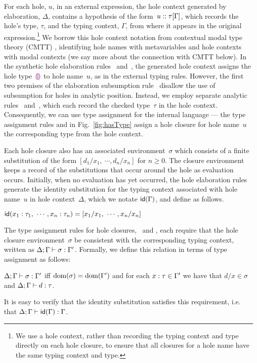 %
For each hole, $u$, in an external expression, the hole context generated
by elaboration, $\Delta$, contains a hypothesis of the
form~$u :: \tau[\Gamma]$, which records the hole's type, $\tau$,
and the typing context, $\Gamma$, from where it appears in the original
expression.\footnote{ We use a hole context, rather than recording the
  typing context and type directly on each hole closure, to ensure that all
  closures for a hole name have the same typing context and type.}
%
We borrow this hole context notation from contextual modal type theory
(CMTT) \cite{Nanevski2008}, identifying hole names with metavariables and
hole contexts with modal contexts (we say more about the connection with
CMTT below).
%
%
In the synthetic hole elaboration rules~
and~, the generated hole context assigns the hole
type~$\textcolor{violet}{\llparenthesis}\textcolor{violet}{\rrparenthesis}$ to hole name~$u$, as in the external typing rules.
%
However, the first two premises of the elaboration subsumption
rule~ disallow the use of subsumption for holes in
analytic position.
%
Instead, we employ separate analytic rules~
and~, which each record the checked type~$\tau$ in the
hole context.
%
Consequently, we can use type assignment for the internal language --- the
type assignment rules  and  in
Fig.~\ref{fig:hasType} assign a hole closure for hole name~$u$ the
corresponding type from the hole context.

Each hole closure also has an associated environment~$\sigma$ which
consists of a finite substitution of the form $[d_1/x_1, ~\cdots, d_n/x_n]$
for $n \geq 0$.
%
The closure environment keeps a record of the substitutions that occur around the hole as evaluation occurs.
%
Initially, when no evaluation has yet occurred, the hole elaboration rules
generate the identity substitution for the typing context associated with
hole name~$u$ in hole context~$\Delta$, which we notate $\mathsf{id}(\Gamma)$,
and define as follows.
%
\begin{defn} $\mathsf{id}(x_1 : \tau_1, ~\cdots, x_n : \tau_n) = [x_1/x_1, ~\cdots, x_n/x_n]$
\end{defn}
\noindent
The type assignment rules for hole closures,~ and , each require that the hole closure environment~$\sigma$ be consistent with the corresponding typing context, written as $\Delta; \Gamma \vdash \sigma : \Gamma'$.
%
Formally, we define this relation in terms of type assignment as follows:
\begin{defn}
$\Delta; \Gamma \vdash \sigma : \Gamma'$ iff $\text{dom}(\sigma) = \text{dom}(\Gamma')$ and for each $x : \tau \in \Gamma'$ we have that $d/x \in \sigma$ and $\Delta; \Gamma \vdash d : \tau$.
\end{defn}
\noindent
It is easy to verify that the identity substitution satisfies this requirement, i.e. that $\Delta; \Gamma \vdash \mathsf{id}(\Gamma) : \Gamma$.

